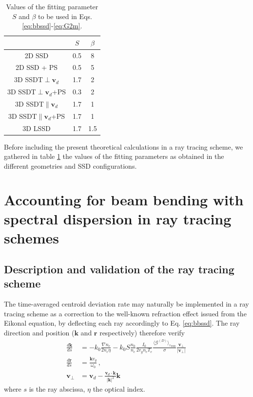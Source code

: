 \documentclass[%
 reprint,
 amsmath,amssymb,
 aps,
]{revtex4-1}
\begin{document}
\begin{table}[]
    \centering
    \begin{tabular}{|c|c|c|}
             \hline
         & $S$ & $\beta$ \\
         \hline
         2D SSD                           & 0.5 & 8 \\
         2D SSD + PS                      & 0.5 & 5 \\
         3D SSDT$\perp    \mathbf{v}_d$    & 1.7 & 2 \\
         3D SSDT$\perp    \mathbf{v}_d$+PS & 0.3 & 2 \\
         3D SSDT$\parallel\mathbf{v}_d$    & 1.7 & 1 \\
         3D SSDT$\parallel\mathbf{v}_d$+PS & 1.7 & 1 \\
         3D LSSD                          & 1.7 & 1.5 \\
         \hline
    \end{tabular}
    \caption{ \label{tab:bb}
    Values of the fitting parameter $S$ and $\beta$ to be used in Eqs. \eqref{eq:bbssd}-\eqref{eq:G2m}.}
\end{table}
Before including the present theoretical calculations in a ray tracing scheme, we gathered in table \ref{tab:bb} the values of the fitting parameters as obtained in the different geometries and SSD configurations.

\section{Accounting for beam bending with spectral dispersion in  ray tracing schemes}
\subsection{Description and validation of the ray tracing scheme}\label{sec:ray}
The time-averaged centroid deviation rate  may naturally be implemented in a ray tracing scheme as a correction to the well-known refraction effect issued from the Eikonal equation, by deflecting each ray accordingly to   Eq. \eqref{eq:bbssd}.
The ray direction and position ($\mathbf{k}$ and  $\mathbf{r}$ respectively)  therefore verify
\begin{align}
    \frac{d\mathbf{k}}{ds} &=-k_0 \frac{\nabla n_e }{2n_c\eta} -k_0   S    \frac{n_0 }{n_c}  \frac{  I_0 }{ 2 v_g n_c T_e }    \frac{\langle \mathcal{G}^{(D)} \rangle_\mathrm{\tau_\mathrm{SSD}}}{ \sigma} \frac{\mathbf{v}_\perp}{\vert \mathbf{v}_\perp \vert}  \, \nonumber\\
        \frac{d\mathbf{r}}{ds} &= \frac{\mathbf{k}v_g}{\omega_0} \, , \nonumber\\
    \mathbf{v}_\perp&= \mathbf{v}_d - \frac{ \mathbf{v}_d\cdot \mathbf{k}}{\vert  \mathbf{k}\vert^2}\mathbf{k}\, \label{eq:raybb}  
\end{align}
where $s$ is the ray abscissa, $\eta$ the optical index.
\end{document}
